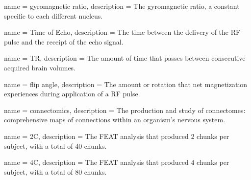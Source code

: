 {
	name = {gyromagnetic ratio},
	description = {The gyromagnetic ratio, a constant specific to each different nucleus.\newline}
}

{
	name = {Time of Echo},
	description = {The time between the delivery of the RF pulse and the receipt of the echo signal.\newline}
}

{
	name = {TR},
	description = {The amount of time that passes between consecutive acquired brain volumes.\newline}
}

{
	name = {flip angle},
	description = {The amount or rotation that net magnetization experiences during application of a RF pulse.\newline}
}

{
	name = {connectomics},
	description = {The production and study of connectomes: comprehensive maps of connections within an organism's nervous system.\newline}
}

{
	name = {2C},
	description = {The FEAT analysis that produced 2 chunks per subject, with a total of 40 chunks.\newline}
}

{
	name = {4C},
	description = {The FEAT analysis that produced 4 chunks per subject, with a total of 80 chunks.\newline}
}